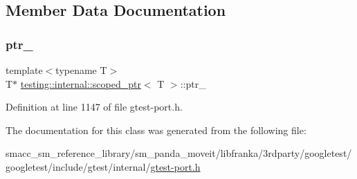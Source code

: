 \subsection{Member Data Documentation}
\mbox{\label{classtesting_1_1internal_1_1scoped__ptr_ab69d9f1f216ae91f8b8abca63e797397}} 
\subsubsection{\texorpdfstring{ptr\+\_\+}{ptr\_}}
{\footnotesize\ttfamily template$<$typename T$>$ \\
T$\ast$ \hyperlink{classtesting_1_1internal_1_1scoped__ptr}{testing\+::internal\+::scoped\+\_\+ptr}$<$ T $>$\+::ptr\+\_\+\hspace{0.3cm}{\ttfamily [private]}}



Definition at line 1147 of file gtest-\/port.\+h.



The documentation for this class was generated from the following file\+:\begin{DoxyCompactItemize}
\item 
smacc\+\_\+sm\+\_\+reference\+\_\+library/sm\+\_\+panda\+\_\+moveit/libfranka/3rdparty/googletest/googletest/include/gtest/internal/\hyperlink{gtest-port_8h}{gtest-\/port.\+h}\end{DoxyCompactItemize}
